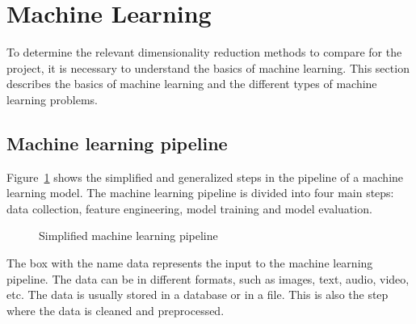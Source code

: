 
\section{Machine Learning}\label{sec:machine-learning}
To determine the relevant dimensionality reduction methods to compare for the project, it is necessary to understand the basics of machine learning. This section describes the basics of machine learning and the different types of machine learning problems.


\subsection{Machine learning pipeline}\label{subsec:machine-learning-pipeline}
Figure~\ref{fig:basic-machine-learning-pipeline} shows the simplified and generalized steps in the pipeline of a machine learning model. The machine learning pipeline is divided into four main steps: data collection, feature engineering, model training and model evaluation.


\begin{figure}[htb!]
    \centering
    \caption{Simplified machine learning pipeline}
    \label{fig:basic-machine-learning-pipeline}
\end{figure}


The box with the name data represents the input to the machine learning pipeline. The data can be in different formats, such as images, text, audio, video, etc. The data is usually stored in a database or in a file. This is also the step where the data is cleaned and preprocessed.

